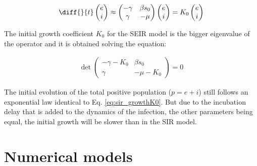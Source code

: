 \documentclass[DIV=12, BCOR=0pt]{scrartcl}  %
\begin{document}
  \begin{align}
  	\diff{}{t}
  	\begin{pmatrix}
  			e \\
  			i
  	\end{pmatrix}
  	\approx 
  	\begin{pmatrix}
  		 - \gamma & \beta s_0\\
  		 \gamma & - \mu
  	\end{pmatrix}
  	\begin{pmatrix}
  		e \\
  		i
  	\end{pmatrix}
	  = K_0 %
	  \begin{pmatrix}
	  	e \\
	  	i
	  \end{pmatrix} %
		\label{eq:seir_approxi}
	\end{align}

The initial growth coefficient $K_0$ for the SEIR model is the bigger eigenvalue of the operator and it is obtained solving the equation: 

	\begin{align}
		\det 
		\begin{pmatrix}
			- \gamma - K_0 & \beta s_0\\ %
			\gamma & - \mu - K_0  %
		\end{pmatrix} = 0
	\label{eq:seir_K0}
	\end{align}
 
 The initial evolution of the total positive population ($p = e + i$) still follows an exponential law identical to Eq. \ref{eq:sir_growthK0}. But due to the incubation delay that is added to the dynamics of the infection, the other parameters being equal, the initial growth will be slower than in the SIR model.
 
	\section{Numerical models}
	\label{sec:numerical}
	
\end{document}
